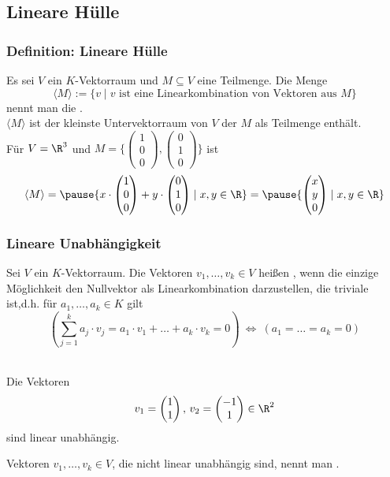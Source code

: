 \subsection{Lineare Hülle}
%
%
\begin{frame}\frametitle{Definition: Lineare Hülle}
Es sei $V$ ein $K$-Vektorraum und $M \subseteq V$ eine Teilmenge. Die Menge
$$
\langle M \rangle := \{v \mid v \text{ ist eine Linearkombination von Vektoren aus } M\}
$$
nennt man die . \\\pause
$\langle M \rangle$ ist der kleinste Untervektorraum von $V$ der $M$ als Teilmenge enthält.
\vfill\pause
{}\\
Für $V=\R^3$ und  $M=\{\begin{pmatrix} 1 \\ 0 \\ 0 \end{pmatrix},\begin{pmatrix} 0 \\ 1 \\ 0 \end{pmatrix} \}$ ist \pause
$$
\langle M \rangle= \pause\{x\cdot \begin{pmatrix} 1 \\0\\ 0 \end{pmatrix} +y \cdot \begin{pmatrix} 0 \\1\\ 0 \end{pmatrix}\mid x,y \in \R \}=\pause \{\begin{pmatrix} x \\ y \\ 0 \end{pmatrix}\mid x,y \in \R \}
$$
\end{frame}
%
%
\begin{frame}\frametitle{Lineare Unabhängigkeit}
	
	Sei $V$ ein $K$-Vektorraum. 
	Die Vektoren $v_1,\ldots, v_k \in V$ hei{\ss}en , wenn die einzige Möglichkeit den Nullvektor als Linearkombination darzustellen, die triviale ist,\pause d.h.
	für $a_1,\ldots, a_k\in K$  gilt
	$$
		\left(\sum_{j=1}^k a_j\cdot v_j = a_1\cdot v_1 + \ldots + a_k\cdot v_k = 0 \right) \ \Leftrightarrow \ \left( a_1=\ldots = a_k = 0 \right)
	$$
	
	\pause
	\\[1mm]
	
	Die Vektoren
	$$
		v_1 = \begin{pmatrix}
				1\\
				1
			\end{pmatrix},
		\,
		v_2 = \begin{pmatrix}
				-1\\
				1
			\end{pmatrix}
		\in \R^2
	$$
	sind linear unabhängig.
	
	\pause
	\vspace{3mm}
	Vektoren $v_1,\ldots, v_k \in V$, die nicht linear unabhängig sind, nennt man .
		
\end{frame}
